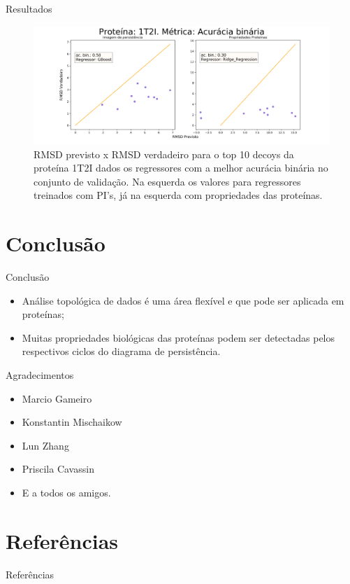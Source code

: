 \documentclass[10pt]{beamer}
\begin{document}
\begin{frame}{Resultados}
\begin{figure}
    \centering
    \includegraphics[width=1.0\textwidth]{images/1t2i_binary.png}
    \caption{RMSD previsto x RMSD verdadeiro para o top 10 decoys da proteína 1T2I dados os
             regressores com a melhor acurácia binária no conjunto de validação. Na 
            esquerda os valores para regressores treinados com PI's, já na esquerda com propriedades
            das proteínas.}
    \label{fig:1t2i_binary}
\end{figure}
\end{frame}

\section{Conclusão}

\begin{frame}{Conclusão}
    \begin{itemize}
        \item Análise topológica de dados é uma área flexível e que pode ser aplicada em proteínas;
        \item Muitas propriedades biológicas das proteínas podem ser detectadas pelos respectivos ciclos
         do diagrama de persistência.
    \end{itemize}
\end{frame}

\begin{frame}{Agradecimentos}
    \begin{itemize}
        \pause
        \item Marcio Gameiro
        \pause
        \item Konstantin Mischaikow
        \item Lun Zhang
        \pause
        \item Priscila Cavassin
        \pause
        \item E a todos os amigos.
    \end{itemize} 
\end{frame}

\section{Referências}

\begin{frame}[allowframebreaks]{Referências}
  
    \nocite{*}
    
 
\end{frame}
\end{document}
